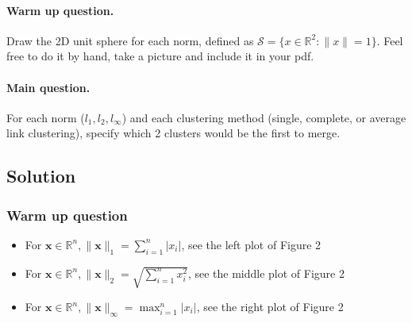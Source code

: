 \documentclass[submit]{harvardml}
\begin{document}
\begin{problem}
  \paragraph{Warm up question.} \noindent Draw the 2D unit sphere for each norm,
  defined as $\mathcal{S} = \{x \in \mathbb{R}^2: \|x\| = 1 \}$. Feel free to do
  it by hand, take a picture and include it in your pdf.

  \paragraph{Main question.}
  \noindent For each norm ($l_1, l_2, l_\infty$) and each clustering method
  (single, complete, or average link clustering), specify which 2 clusters would
  be the first to merge.
\end{problem}
\subsection*{Solution}

\subsubsection*{Warm up question}

\begin{itemize}
\item For $\mathbf{x} \in \mathbb{R}^n, \| \mathbf{x} \|_1 = \sum_{i = 1}^n |x_i|$, see the left plot of Figure 2
\item For $\mathbf{x} \in \mathbb{R}^n, \| \mathbf{x} \|_2 = \sqrt{\sum_{i = 
1}^n x_i^2 }$, see the middle plot of Figure 2
\item For $\mathbf{x} \in \mathbb{R}^n, \| \mathbf{x} \|_{\infty} = \max_{i = 
1}^n |x_i|$, see the right plot of Figure 2
\end{itemize}
\end{document}
